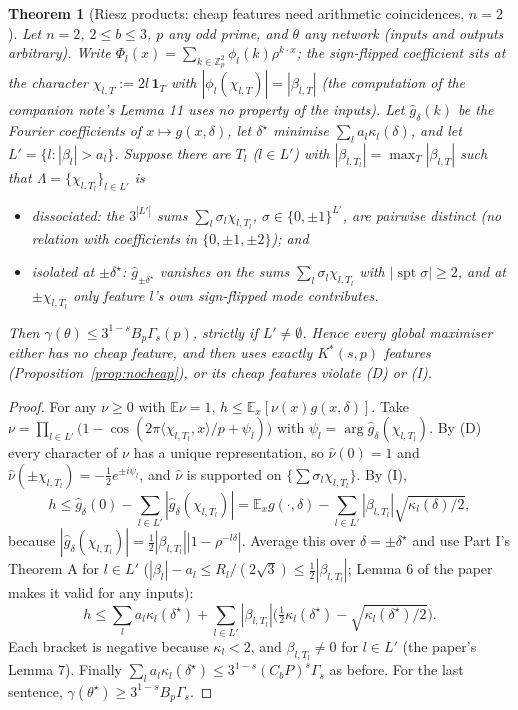 \documentclass[11pt]{article}
\newtheorem{theorem}{Theorem}
\theoremstyle{definition}
\begin{document}
\begin{theorem}[Riesz products: cheap features need arithmetic coincidences, $n=2$]\label{thm:riesz}
Let $n=2$, $2\le b\le3$, $p$ any odd prime, and $\theta$ any network (inputs and outputs arbitrary).  Write
$\Phi_l(x)=\sum_{k\in\mathbb Z_p^2}\phi_l(k)\rho^{k\cdot x}$; the sign-flipped coefficient sits at the character
$\chi_{l,T}:=2l\,\mathbf 1_T$ with $|\phi_l(\chi_{l,T})|=|\beta_{l,T}|$ (the computation of the companion note's Lemma 11 uses no
property of the inputs).  Let $\hat g_\delta(k)$ be the Fourier coefficients of $x\mapsto g(x,\delta)$, let $\delta^\star$ minimise
$\sum_la_l\kappa_l(\delta)$, and let $L'=\{l:|\beta_l|>a_l\}$.  Suppose there are $T_l$ ($l\in L'$) with
$|\beta_{l,T_l}|=\max_T|\beta_{l,T}|$ such that $\Lambda=\{\chi_{l,T_l}\}_{l\in L'}$ is
\begin{itemize}
\item[(D)] \emph{dissociated}: the $3^{|L'|}$ sums $\sum_l\sigma_l\chi_{l,T_l}$, $\sigma\in\{0,\pm1\}^{L'}$, are pairwise distinct (no relation with coefficients in $\{0,\pm1,\pm2\}$); and
\item[(I)] \emph{isolated} at $\pm\delta^\star$: $\hat g_{\pm\delta^\star}$ vanishes on the sums $\sum_l\sigma_l\chi_{l,T_l}$ with
$|\operatorname{spt}\sigma|\ge2$, and at $\pm\chi_{l,T_l}$ only feature $l$'s own sign-flipped mode contributes.
\end{itemize}
Then $\gamma(\theta)\le3^{1-s}B_p\Gamma_s(p)$, strictly if $L'\ne\emptyset$.  Hence every global maximiser either has no cheap
feature, and then uses exactly $K^*(s,p)$ features (Proposition~\ref{prop:nocheap}), or its cheap features violate (D)
or (I).
\end{theorem}
\begin{proof}
For any $\nu\ge0$ with $\mathbb E\nu=1$, $h\le\mathbb E_x[\nu(x)g(x,\delta)]$.  Take
$\nu=\prod_{l\in L'}\big(1-\cos(2\pi\langle\chi_{l,T_l},x\rangle/p+\psi_l)\big)$ with $\psi_l=\arg\hat g_\delta(\chi_{l,T_l})$.  By (D) every character of $\nu$ has a unique representation, so
$\hat\nu(0)=1$ and $\hat\nu(\pm\chi_{l,T_l})=-\frac12e^{\pm i\psi_l}$, and $\hat\nu$ is supported on $\{\sum\sigma_l\chi_{l,T_l}\}$.  By (I),
\[h\le\hat g_\delta(0)-\sum_{l\in L'}|\hat g_\delta(\chi_{l,T_l})|=\mathbb E_xg(\cdot,\delta)-\sum_{l\in L'}|\beta_{l,T_l}|\sqrt{\kappa_l(\delta)/2},\]
because $|\hat g_\delta(\chi_{l,T_l})|=\frac12|\beta_{l,T_l}||1-\rho^{-l\delta}|$.  Average this over $\delta=\pm\delta^\star$ and use Part I's
Theorem A for $l\in L'$ ($|\beta_l|-a_l\le R_l/(2\sqrt3)\le\frac12|\beta_{l,T_l}|$; Lemma 6 of the paper makes it valid for any
inputs):
\[h\le\sum_la_l\kappa_l(\delta^\star)+\sum_{l\in L'}|\beta_{l,T_l}|\Big(\tfrac12\kappa_l(\delta^\star)-\sqrt{\kappa_l(\delta^\star)/2}\Big).\]
Each bracket is negative because $\kappa_l<2$, and $\beta_{l,T_l}\ne0$ for $l\in L'$ (the paper's Lemma 7).  Finally
$\sum_la_l\kappa_l(\delta^\star)\le3^{1-s}(C_bP)^s\Gamma_s$ as before.  For the last sentence, $\gamma(\theta^\star)\ge3^{1-s}B_p\Gamma_s$.
\end{proof}
\end{document}
